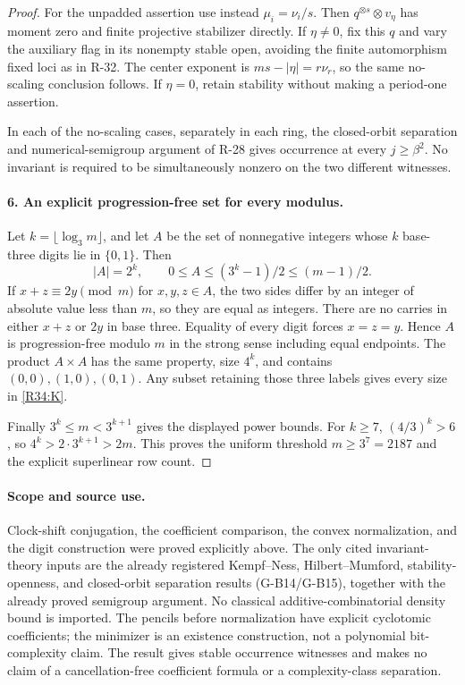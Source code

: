 \begin{proof}
For the unpadded assertion use instead $\mu_i=\nu_i/s$.
Then $q^{\otimes s}\otimes v_\eta$ has moment zero and
finite projective stabilizer directly. If $\eta\ne0$, fix
this $q$ and vary the auxiliary flag in its nonempty stable
open, avoiding the finite automorphism fixed loci as in
R-32. The center exponent is $ms-|\eta|=r\nu_r$, so the
same no-scaling conclusion follows. If $\eta=0$, retain
stability without making a period-one assertion.

In each of the no-scaling cases, separately in each ring,
the closed-orbit separation and numerical-semigroup argument
of R-28 gives occurrence at every $j\geq\beta^2$. No
invariant is required to be simultaneously nonzero on the
two different witnesses.

\paragraph{6. An explicit progression-free set for every modulus.}
Let $k=\lfloor\log_3 m\rfloor$, and let $A$ be the set of
nonnegative integers whose $k$ base-three digits lie in
$\{0,1\}$. Then
\[
 |A|=2^k,\qquad 0\leq A\leq(3^k-1)/2\leq(m-1)/2.
\]
If $x+z\equiv2y\pmod m$ for $x,y,z\in A$, the two sides
differ by an integer of absolute value less than $m$, so
they are equal as integers. There are no carries in either
$x+z$ or $2y$ in base three. Equality of every digit forces
$x=z=y$. Hence $A$ is progression-free modulo $m$ in the
strong sense including equal endpoints.
The product $A\times A$ has the same property, size $4^k$,
and contains $(0,0),(1,0),(0,1)$.
Any subset retaining those three labels gives every size
in \eqref{R34:K}.

Finally $3^k\leq m<3^{k+1}$ gives the displayed power bounds.
For $k\geq7$, $(4/3)^k>6$, so
$4^k>2\cdot3^{k+1}>2m$. This proves the uniform threshold
$m\geq3^7=2187$ and the explicit superlinear row count.
\end{proof}

\paragraph{Scope and source use.}
Clock-shift conjugation, the coefficient comparison, the
convex normalization, and the digit construction were proved
explicitly above. The only cited invariant-theory inputs are
the already registered Kempf--Ness, Hilbert--Mumford,
stability-openness, and closed-orbit separation results
(G-B14/G-B15), together with the already proved semigroup
argument. No classical additive-combinatorial density bound
is imported. The pencils before normalization have explicit
cyclotomic coefficients; the minimizer is an existence
construction, not a polynomial bit-complexity claim.
The result gives stable occurrence witnesses and makes no
claim of a cancellation-free coefficient formula or a
complexity-class separation.
